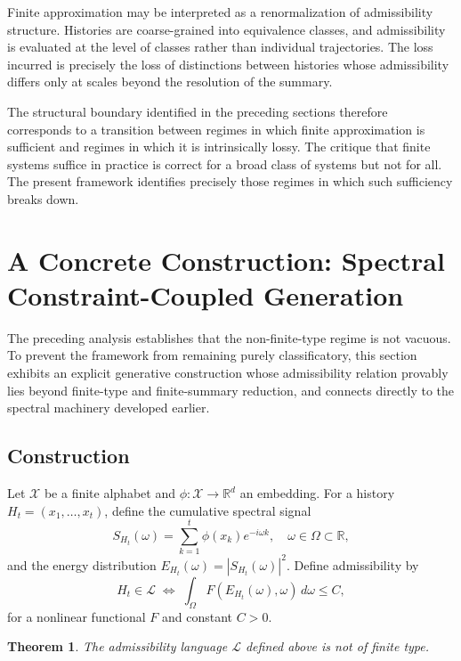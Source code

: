 \documentclass[12pt, a4paper]{article}
\theoremstyle{plain}
\newtheorem{theorem}{Theorem}[section]
\theoremstyle{definition}
\theoremstyle{remark}
\begin{document}
Finite approximation may be interpreted as a renormalization of admissibility structure. Histories are coarse-grained into equivalence classes, and admissibility is evaluated at the level of classes rather than individual trajectories. The loss incurred is precisely the loss of distinctions between histories whose admissibility differs only at scales beyond the resolution of the summary.

The structural boundary identified in the preceding sections therefore corresponds to a transition between regimes in which finite approximation is sufficient and regimes in which it is intrinsically lossy. The critique that finite systems suffice in practice is correct for a broad class of systems but not for all. The present framework identifies precisely those regimes in which such sufficiency breaks down.

\section{A Concrete Construction: Spectral Constraint-Coupled Generation}

The preceding analysis establishes that the non-finite-type regime is not vacuous. To prevent the framework from remaining purely classificatory, this section exhibits an explicit generative construction whose admissibility relation provably lies beyond finite-type and finite-summary reduction, and connects directly to the spectral machinery developed earlier.

\subsection{Construction}

Let $\mathcal{X}$ be a finite alphabet and $\phi : \mathcal{X} \to \mathbb{R}^d$ an embedding. For a history $H_t = (x_1, \dots, x_t)$, define the cumulative spectral signal
\[
S_{H_t}(\omega) = \sum_{k=1}^t \phi(x_k) e^{-i\omega k}, \quad \omega \in \Omega \subset \mathbb{R},
\]
and the energy distribution $E_{H_t}(\omega) = |S_{H_t}(\omega)|^2$. Define admissibility by
\[
H_t \in \mathcal{L} \;\Longleftrightarrow\; \int_\Omega F(E_{H_t}(\omega), \omega)\,d\omega \le C,
\]
for a nonlinear functional $F$ and constant $C > 0$.

\begin{theorem}
The admissibility language $\mathcal{L}$ defined above is not of finite type.
\end{theorem}
\end{document}
